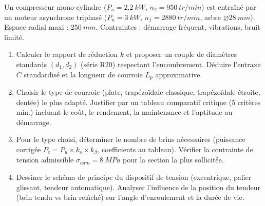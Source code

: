 \documentclass[11pt]{article}
\begin{document}
\begin{exercice}
Un compresseur mono-cylindre ($P_u = \SI{2,2}{kW}$, $n_2 = \SI{950}{tr/min}$) est entraîné par un moteur asynchrone triphasé ($P_n = \SI{3}{kW}$, $n_1 = \SI{2880}{tr/min}$, arbre $\varnothing\SI{28}{mm}$). Espace radial maxi : $\SI{250}{mm}$. Contraintes : démarrage fréquent, vibrations, bruit limité.
\begin{enumerate}
    \item Calculer le rapport de réduction $k$ et proposer un couple de diamètres standards $(d_1, d_2)$ (série R20) respectant l'encombrement. Déduire l'entraxe $C$ standardisé et la longueur de courroie $L_p$ approximative.
    \item Choisir le type de courroie (plate, trapézoïdale classique, trapézoïdale étroite, dentée) le plus adapté. Justifier par un tableau comparatif critique (5 critères min.) incluant le coût, le rendement, la maintenance et l'aptitude au démarrage.
    \item Pour le type choisi, déterminer le nombre de brins nécessaires (puissance corrigée $P_c = P_u \times k_s \times k_\beta$, coefficients au tableau). Vérifier la contrainte de tension admissible $\sigma_{adm} = \SI{8}{MPa}$ pour la section la plus sollicitée.
    \item Dessiner le schéma de principe du dispositif de tension (excentrique, palier glissant, tendeur automatique). Analyser l'influence de la position du tendeur (brin tendu vs brin relâché) sur l'angle d'enroulement et la durée de vie.
\end{enumerate}
\end{exercice}
\end{document}

